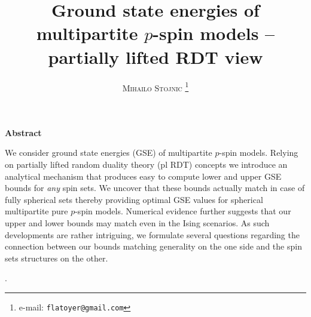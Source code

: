\documentclass[10pt]{article}
\begin{document}
\begin{singlespace}

\title {Ground state energies of multipartite $p$-spin models  -- partially lifted RDT view %
}
\author{
\textsc{Mihailo Stojnic
\footnote{e-mail: {\tt flatoyer@gmail.com}} }}
\date{}
\maketitle


\centerline{{\bf Abstract}} \vspace*{0.1in}


We consider ground state energies (GSE) of multipartite $p$-spin models. Relying on partially lifted random duality theory (pl RDT) concepts we introduce an analytical mechanism that produces easy to compute lower and upper GSE bounds for \emph{any} spin sets. We uncover that these bounds actually match in case of fully spherical sets thereby providing optimal GSE values for spherical multipartite pure $p$-spin models. Numerical evidence further suggests that our upper and lower bounds may match even in the Ising scenarios. As such developments are rather intriguing, we formulate several questions regarding the connection between our bounds matching generality on the one side and the spin sets structures on the other.






\vspace*{0.25in} .

\end{singlespace}

\end{document}
